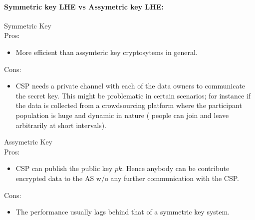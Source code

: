 \paragraph{Symmetric key LHE vs Assymetric key LHE:} Symmetric Key\\ Pros:\begin{itemize} \item More efficient than assymteric key cryptosytems in general.\end{itemize}Cons:\begin{itemize}\item CSP needs a private channel with each of the data owners to communicate the secret key. This might be problematic in certain scenarios; for instance if the data is collected from a crowdsourcing platform where the participant population is huge and dynamic in nature ( people can join and leave arbitrarily at short intervals). \end{itemize}
Assymetric Key\\
Pros:
\begin{itemize}\item CSP can publish the public key $pk$. Hence anybody can be contribute encrypted data to the AS w/o any further communication with the CSP. \end{itemize}
Cons:
\begin{itemize} \item The performance usually lags behind that of a symmetric key system.\end{itemize}
